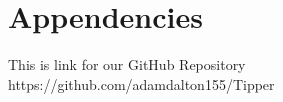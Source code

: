 \chapter{Appendencies}
This is link for our GitHub Repository https://github.com/adamdalton155/Tipper